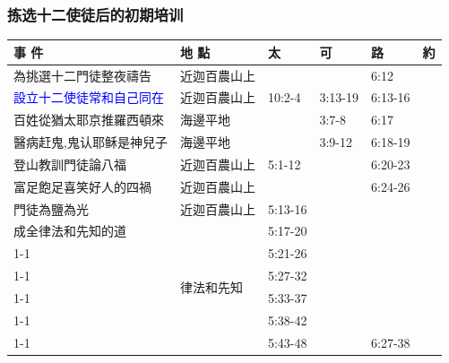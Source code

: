 \subsubsection{拣选十二使徒后的初期培训}
\begin{table}[H]
\centering 
\begin{tabular}{p{13.07em}|p{8.43em}|p{5.285em}|p{5.57em}|p{5.285em}|p{4.855em}}
\toprule
\textbf{事 件} & \textbf{地 點} & \textbf{太} & \textbf{可} & \textbf{路} & \textbf{約} \\\midrule

為挑選十二門徒整夜禱告& 近迦百農山上  & \multicolumn{1}{r|}{} & & 6:12& \multicolumn{1}{r}{} \\ \midrule

\textcolor{blue}{設立十二使徒常和自己同在}& 近迦百農山上  & \multicolumn{1}{l|}{10:2-4} & 3:13-19 & 6:13-16 & \multicolumn{1}{r}{} \\ \midrule

百姓從猶太耶京推羅西頓來& \multicolumn{1}{l|}{海邊平地} & \multicolumn{1}{l|}{} & \multicolumn{1}{l|}{3:7-8} & 6:17& \multicolumn{1}{r}{} \\\midrule

醫病赶鬼,鬼认耶稣是神兒子& \multicolumn{1}{l|}{海邊平地} & \multicolumn{1}{l|}{} & \multicolumn{1}{l|}{3:9-12} & 6:18-19 & \multicolumn{1}{r}{} \\\midrule

登山教訓門徒論八福& 近迦百農山上  & 5:1-12& \multicolumn{1}{r|}{} & \multicolumn{1}{l|}{6:20-23} & \multicolumn{1}{r}{} \\    \midrule

富足飽足喜笑好人的四禍& 近迦百農山上&  & \multicolumn{1}{r|}{} & \multicolumn{1}{l|}{6:24-26} & \multicolumn{1}{r}{} \\    \midrule

門徒為鹽為光& 近迦百農山上& 5:13-16& \multicolumn{1}{r|}{} & \multicolumn{1}{r|}{} & \multicolumn{1}{r}{} \\    \midrule

成全律法和先知的道&\multicolumn{1}{l|}{\multirow{6}{*}{律法和先知}}& 5:17-20& \multicolumn{1}{r|}{} & \multicolumn{1}{r|}{} & \multicolumn{1}{r}{} \\   
\cmidrule{1-1}\cmidrule{3-6}{不可殺人愛仇敵}&& 5:21-26& \multicolumn{1}{r|}{} & \multicolumn{1}{r|}{} & \multicolumn{1}{r}{} \\   
\cmidrule{1-1}\cmidrule{3-6}{不可姦淫休妻}&   & 5:27-32& \multicolumn{1}{r|}{} & \multicolumn{1}{r|}{} & \multicolumn{1}{r}{} \\    
\cmidrule{1-1}\cmidrule{3-6}{不可背誓}&   & 5:33-37& \multicolumn{1}{r|}{} & \multicolumn{1}{r|}{} & \multicolumn{1}{r}{} \\   
\cmidrule{1-1}\cmidrule{3-6}{以眼還眼，以牙還牙}&   & 5:38-42& \multicolumn{1}{r|}{} & \multicolumn{1}{r|}{} & \multicolumn{1}{r}{} \\   
\cmidrule{1-1}\cmidrule{3-6}{愛鄰舍恨仇敵}&  & 5:43-48& \multicolumn{1}{r|}{} & \multicolumn{1}{l|}{6:27-38} & \multicolumn{1}{r}{} \\    \midrule


\end{tabular}
\end{table}
